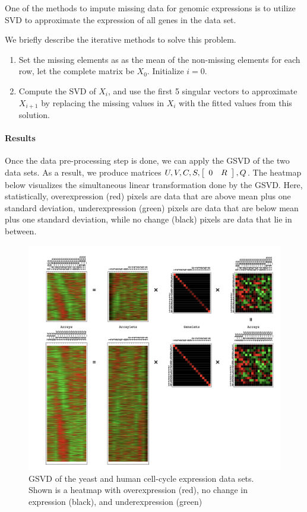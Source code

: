 One of the methods to impute missing data for genomic expressions is to utilize SVD to approximate the expression of all genes in the data set. \cite{hastie1999imputing} \cite{troyanskaya2001missing}

We briefly describe the iterative methods to solve this problem. 
\begin{enumerate}
	\item Set the missing elements as as the mean of the non-missing elements for each row, let the complete matrix be $X_{0}$. Initialize $i = 0$.
	\item Compute the SVD of $X_{i}$, and use the first 5 singular vectors to approximate $X_{i+1}$ by replacing the missing values in $X_{i}$ with the fitted values from this solution.
\end{enumerate}

\paragraph{Results}
	Once the data pre-processing step is done, we can apply the GSVD of the two data sets. As a result, we produce matrices $U, V, C, S, \left[ \begin{array}{cc} 0 & R \end{array} \right], Q$. The heatmap below  visualizes the simultaneous linear transformation done by the GSVD.  Here, statistically, overexpression (red) pixels are data that are above mean plus one standard deviation, underexpression (green) pixels are data that are below mean plus one standard deviation, while no change (black) pixels are data that lie in between. 

	\begin{figure}[H]
        \centering
        \includegraphics[width=0.85\linewidth]{fig/example_heatmap.png}
        \caption{GSVD of the yeast and human cell-cycle expression data sets. Shown is a heatmap with overexpression (red), no change in expression (black), and underexpression (green)}
        \label{heatmap}
    \end{figure}
    
